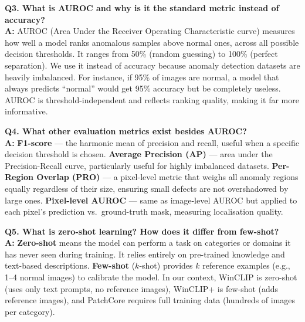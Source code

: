 \documentclass[12pt, a4paper]{article}
\begin{document}
\begin{qa}
\textbf{Q3. What is AUROC and why is it the standard metric instead of accuracy?}\\[4pt]
\textbf{A:} AUROC (Area Under the Receiver Operating Characteristic curve) measures how well a model ranks anomalous samples above normal ones, across all possible decision thresholds. It ranges from 50\% (random guessing) to 100\% (perfect separation). We use it instead of accuracy because anomaly detection datasets are heavily imbalanced. For instance, if 95\% of images are normal, a model that always predicts ``normal'' would get 95\% accuracy but be completely useless. AUROC is threshold-independent and reflects ranking quality, making it far more informative.
\end{qa}

\begin{qa}
\textbf{Q4. What other evaluation metrics exist besides AUROC?}\\[4pt]
\textbf{A:} \textbf{F1-score} --- the harmonic mean of precision and recall, useful when a specific decision threshold is chosen. \textbf{Average Precision (AP)} --- area under the Precision-Recall curve, particularly useful for highly imbalanced datasets. \textbf{Per-Region Overlap (PRO)} --- a pixel-level metric that weighs all anomaly regions equally regardless of their size, ensuring small defects are not overshadowed by large ones. \textbf{Pixel-level AUROC} --- same as image-level AUROC but applied to each pixel's prediction vs.\ ground-truth mask, measuring localisation quality.
\end{qa}

\begin{qa}
\textbf{Q5. What is zero-shot learning? How does it differ from few-shot?}\\[4pt]
\textbf{A:} \textbf{Zero-shot} means the model can perform a task on categories or domains it has never seen during training. It relies entirely on pre-trained knowledge and text-based descriptions. \textbf{Few-shot} ($k$-shot) provides $k$ reference examples (e.g., 1--4 normal images) to calibrate the model. In our context, WinCLIP is zero-shot (uses only text prompts, no reference images), WinCLIP+ is few-shot (adds reference images), and PatchCore requires full training data (hundreds of images per category).
\end{qa}
\end{document}
